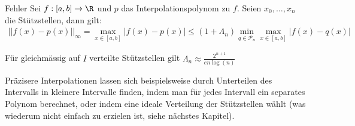 \begin{theorem}[]{Fehler}
    Sei $f : [a, b] \rightarrow \R$ und $p$ das Interpolationspolynom zu $f$. Seien $x_0, \ldots, x_n$ die Stützstellen, dann gilt:
    \rmvspace
    \begin{align*}
        ||f(x) - p(x)||_{\infty} = \max_{x \in [a, b]}|f(x) - p(x)| \leq (1 + \Lambda_n) \min_{q \in \mathcal{P}_n} \max_{x \in [a, b]} |f(x) - q(x)|
    \end{align*}
\end{theorem}

\inlineremark Für gleichmässig auf $I$ verteilte Stützstellen gilt $\displaystyle \Lambda_n \approx \frac{2^{n + 1}}{e n \log(n)}$

 

Präzisere Interpolationen lassen sich beispielsweise durch Unterteilen des Intervalls in kleinere Intervalle finden, indem man für jedes Intervall ein separates Polynom berechnet, oder indem eine ideale Verteilung der Stützstellen wählt (was wiederum nicht einfach zu erzielen ist, siehe nächstes Kapitel).
